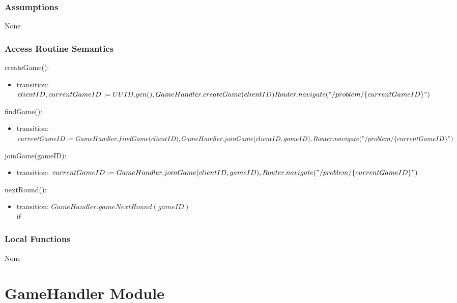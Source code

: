 \documentclass[12pt, titlepage]{article}
\begin{document}
\subsubsection{Assumptions}

None

\subsubsection{Access Routine Semantics}

\noindent createGame():
\begin{itemize}
\item transition: $clientID, currentGameID :=  UUID.gen(),\\ GameHandler.createGame(clientID)\\
Router.navigate("/problem/\{currentGameID\}")$
\end{itemize}

\noindent findGame():
\begin{itemize}
\item transition: $currentGameID := GameHandler.findGame(clientID), 
\\GameHandler.joinGame(clientID, gameID), 
\\Router.navigate("/problem/\{currentGameID\}")$ 
\end{itemize}

\noindent joinGame(gameID):
\begin{itemize}
\item transition: $currentGameID := GameHandler.joinGame(clientID, gameID),\\ Router.navigate("/problem/\{currentGameID\}")$
\end{itemize}

\noindent nextRound():
\begin{itemize}
\item transition: $GameHandler.gameNextRound(gameID)$\\
if 
\end{itemize}


\subsubsection{Local Functions}

None


\newpage



\section{GameHandler Module} \label{GameHandler} 
\end{document}
